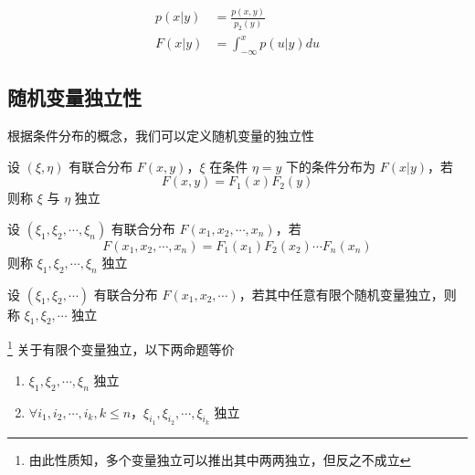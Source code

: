 \documentclass[12pt,a4paper]{amsart}
\begin{document}
\begin{definition}[连续型条件分布]
    \begin{equation}
        \begin{aligned}
            p(x|y) &= \frac{p(x, y)}{p_2(y)} \\
            F(x|y) &= \int_{-\infty}^{x}p(u|y)du
        \end{aligned}
    \end{equation}
\end{definition}

\subsection{随机变量独立性}

根据条件分布的概念，我们可以定义随机变量的独立性

\begin{definition}[两个随机变量的独立性]
    设 $(\xi, \eta)$ 有联合分布 $F(x, y)$，$\xi$ 在条件 $\eta=y$ 下的条件分布为 $F(x|y)$，若
    \begin{equation}
        F(x, y) = F_1(x)F_2(y)
    \end{equation}
    则称 $\xi$ 与 $\eta$ 独立
\end{definition}

\begin{definition}[有限个随机变量的独立性]
    设 $(\xi_1, \xi_2, \cdots, \xi_n)$ 有联合分布 $F(x_1, x_2, \cdots, x_n)$，若
    \begin{equation}
        F(x_1, x_2, \cdots, x_n) = F_1(x_1)F_2(x_2)\cdots F_n(x_n)
    \end{equation}
    则称 $\xi_1, \xi_2, \cdots, \xi_n$ 独立
\end{definition}

\begin{definition}[无限个随机变量的独立性]
    设 $(\xi_1, \xi_2, \cdots)$ 有联合分布 $F(x_1, x_2, \cdots)$，若其中任意有限个随机变量独立，则称 $\xi_1, \xi_2, \cdots$ 独立
\end{definition}

\begin{proposition}\footnote{由此性质知，多个变量独立可以推出其中两两独立，但反之不成立}
    关于有限个变量独立，以下两命题等价
    \begin{enumerate}
        \item $\xi_1, \xi_2, \cdots, \xi_n$ 独立
        \item $\forall i_1, i_2, \cdots, i_k, k\leq n$，$\xi_{i_1}, \xi_{i_2}, \cdots, \xi_{i_k}$ 独立
    \end{enumerate}
\end{proposition}
\end{document}
